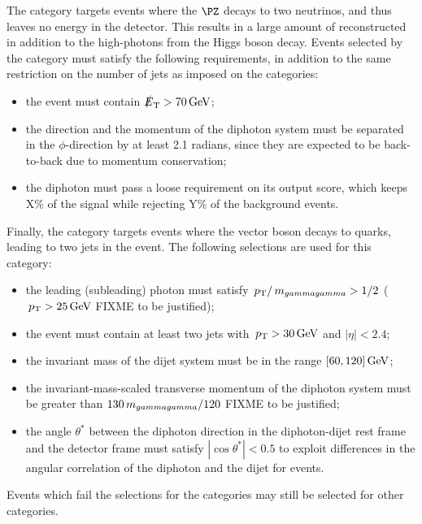 The \VHMETTag category targets events where the $\PZ$ decays to two neutrinos, and thus leaves no energy in the detector. This results in a large amount of reconstructed \MET in addition to the high-\pT photons from the Higgs boson decay. Events selected by the \VHMETTag category must satisfy the following requirements, in addition to the same restriction on the number of jets as imposed on the \VHLeptonicTag categories:
\begin{itemize}
\item the event must contain $\slashed{E}_{\mathrm{T}} > 70\,\text{Ge\hspace{-.08em}V}$;
\item the \MET direction and the momentum of the diphoton system must be separated in the $\phi$-direction by at least 2.1 radians, since they are expected to be back-to-back due to momentum conservation;
\item the diphoton must pass a loose requirement on its \DiPhoBdt output score, which keeps X\% of the signal while rejecting Y\% of the background events.
\end{itemize}

Finally, the \VHHadronicTag category targets events where the vector boson decays to quarks, leading to two jets in the event. 
The following selections are used for this category:
\begin{itemize}
\item the leading (subleading) photon must satisfy $\,p_\text{T}/\,m_{gammagamma} > 1/2$ ($\,p_\text{T} > 25\,\text{Ge\hspace{-.08em}V}$ FIXME to be justified);
\item the event must contain at least two jets with $\,p_\text{T}>30\,\text{Ge\hspace{-.08em}V}$ and $|\eta|<2.4$;
\item the invariant mass of the dijet system must be in the range $[60,120]\,\text{Ge\hspace{-.08em}V}$;
\item the invariant-mass-scaled transverse momentum of the diphoton system must be greater than $130\,m_{gammagamma}/120$ FIXME to be justified; 
\item the angle $\theta^{*}$ between the diphoton direction in the diphoton-dijet rest frame and the detector frame must satisfy $|\cos{\theta^{*}}| <0.5$ to exploit differences in the angular correlation of the diphoton and the dijet for \VH events.
\end{itemize}

Events which fail the selections for the \VHTag categories may still be selected for other categories.
\fi

